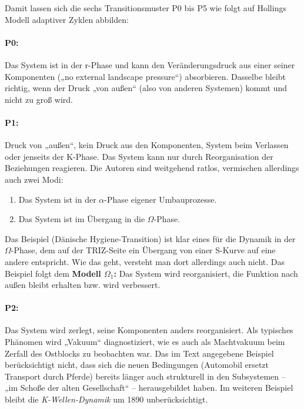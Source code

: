 \documentclass[11pt,a4paper]{article}
\begin{document}
Damit lassen sich die sechs Transitionsmuster P0 bis P5 wie folgt auf Hollings
Modell adaptiver Zyklen abbilden:

\paragraph{P0:}
Das System ist in der r-Phase und kann den Veränderungsdruck aus einer seiner
Komponenten („no external landscape pressure“) absorbieren. Dasselbe bleibt
richtig, wenn der Druck „von außen“ (also von anderen Systemen) kommt und
nicht zu groß wird.

\paragraph{P1:}
Druck von „außen“, kein Druck aus den Komponenten, System beim Verlassen oder
jenseits der K-Phase. Das System kann nur durch Reorganisation der Beziehungen
reagieren. Die Autoren sind weitgehend ratlos, vermischen allerdings auch zwei
Modi:
\begin{enumerate}[noitemsep]
\item Das System ist in der $\alpha$-Phase eigener Umbauprozesse.
\item Das System ist im Übergang in die $\Omega$-Phase.
\end{enumerate}

Das Beispiel (Dänische Hygiene-Transition) ist klar eines für die Dynamik in
der $\Omega$-Phase, dem auf der TRIZ-Seite ein Übergang von einer S-Kurve auf
eine andere entspricht. Wie das geht, versteht man dort allerdings auch
nicht. Das Beispiel folgt dem \textbf{Modell $\Omega_1$:} Das System wird
reorganisiert, die Funktion nach außen bleibt erhalten bzw. wird verbessert.

\paragraph{P2:}
Das System wird zerlegt, seine Komponenten anders reorganisiert. Als typisches
Phäno\-men wird „Vakuum“ diagnostiziert, wie es auch als Machtvakuum beim
Zerfall des Ostblocks zu beobachten war. Das im Text angegebene Beispiel
berücksichtigt nicht, dass sich die neuen Bedingungen (Automobil ersetzt
Transport durch Pferde) bereits länger auch strukturell in den Subsystemen --
„im Schoße der alten Gesellschaft“ -- herausgebildet haben. Im weiteren
Beispiel bleibt die \emph{K-Wellen-Dynamik} um 1890 unberücksichtigt.
\end{document}
